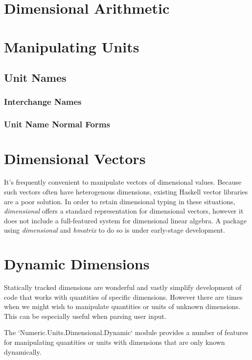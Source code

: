 \documentclass[11pt]{report}
\newcommand{\packagename}[1]{\textit{#1}}
\newcommand{\thispackage}{\packagename{dimensional}}
\newcommand{\submodule}[1]{`Numeric.Units.Dimensional.{#1}`}
\begin{document}
\chapter{Dimensional Arithmetic}

\chapter{Manipulating Units}

\section{Unit Names}

\subsection{Interchange Names}
\subsection{Unit Name Normal Forms}

\chapter{Dimensional Vectors}

It's frequently convenient to manipulate vectors of dimensional values. Because such vectors often have heterogenous
dimensions, existing Haskell vector libraries are a poor solution. In order to retain dimensional typing in these situations,
\thispackage{} offers a standard representation for dimensional vectors, however it does not include a full-featured system for
dimensional linear algebra. A package using \thispackage{} and \packagename{hmatrix} to do so is under early-stage development.


\chapter{Dynamic Dimensions}

Statically tracked dimensions are wonderful and vastly simplify development of code that works with quantities of specific
dimensions. However there are times when we might wish to manipulate quantities or units of unknown dimensions. This can be
especially useful when parsing user input.

The \submodule{Dynamic} module provides a number of features for manipulating quantities or units with dimensions that are only
known dynamically.
\end{document}
